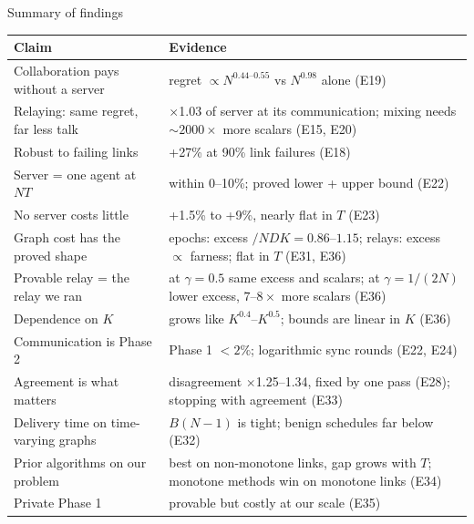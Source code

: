 \documentclass[11pt]{beamer}
\begin{document}
\begin{frame}{Summary of findings}
\tiny
\renewcommand{\arraystretch}{1.15}
\begin{tabular}{>{\raggedright\arraybackslash}p{4.6cm}>{\raggedright\arraybackslash}p{5.6cm}}
\toprule
\textbf{Claim} & \textbf{Evidence}\\
\midrule
Collaboration pays without a server & regret $\propto N^{0.44\text{--}0.55}$ vs $N^{0.98}$ alone (E19)\\
Relaying: same regret, far less talk & $\times$1.03 of server at its communication; mixing needs $\sim2000\times$ more scalars (E15, E20)\\
Robust to failing links & +27\% at 90\% link failures (E18)\\
Server = one agent at $NT$ & within 0--10\%; proved lower + upper bound (E22)\\
No server costs little & +1.5\% to +9\%, nearly flat in $T$ (E23)\\
Graph cost has the proved shape & epochs: excess $/NDK=0.86$--$1.15$; relays: excess $\propto$ farness; flat in $T$ (E31, E36)\\
Provable relay = the relay we ran & at $\gamma=0.5$ same excess and scalars; at $\gamma=1/(2N)$ lower excess, $7$--$8\times$ more scalars (E36)\\
Dependence on $K$ & grows like $K^{0.4}$--$K^{0.5}$; bounds are linear in $K$ (E36)\\
Communication is Phase 2 & Phase 1 $<2\%$; logarithmic sync rounds (E22, E24)\\
Agreement is what matters & disagreement $\times$1.25--1.34, fixed by one pass (E28); stopping with agreement (E33)\\
Delivery time on time-varying graphs & $B(N-1)$ is tight; benign schedules far below (E32)\\
Prior algorithms on our problem & best on non-monotone links, gap grows with $T$; monotone methods win on monotone links (E34)\\
Private Phase 1 & provable but costly at our scale (E35)\\
\bottomrule
\end{tabular}
\end{frame}
\end{document}
